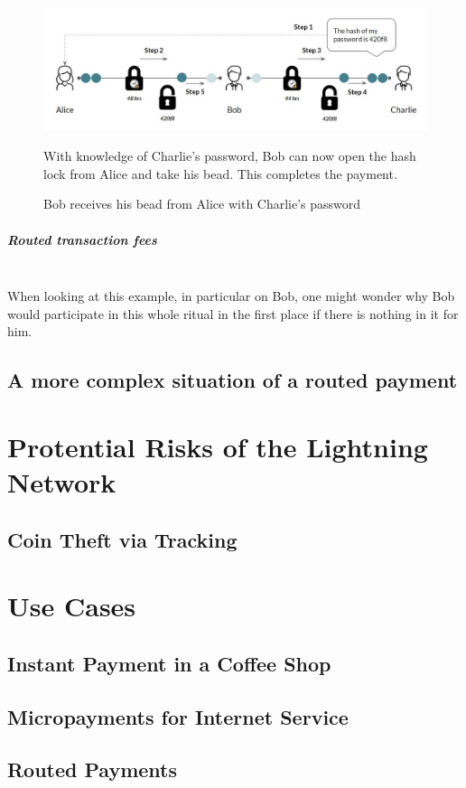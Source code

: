 \documentclass[a4paper, 12pt]{report}
\begin{document}
\begin{figure}[H]
	\includegraphics[width=\textwidth]{12_HTLC_Step4}
	\caption{Bob receives his bead from Alice with Charlie's password}
	\medskip
	\small With knowledge of Charlie's password, Bob can now open the hash lock from Alice and take his bead. This completes the payment.
	\label{fig:12_HTLC_Step4}
\end{figure} 

\paragraph{Routed transaction fees} \hspace{0pt} \\
When looking at this example, in particular on Bob, one might wonder why Bob would participate in this whole ritual in the first place if there is nothing in it for him. 

\section{A more complex situation of a routed payment}

\chapter{Protential Risks of the Lightning Network}
\section{Coin Theft via Tracking}

\chapter{Use Cases}
\section{Instant Payment in a Coffee Shop}
\section{Micropayments for Internet Service}
\section{Routed Payments}
\end{document}

